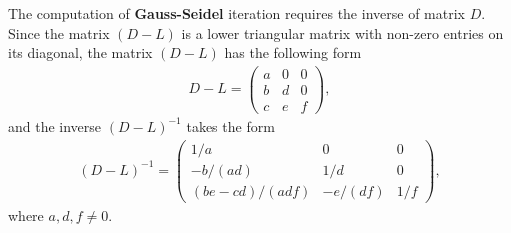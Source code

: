 \documentclass[12pt]{article}
\begin{document}
\begin{remark}
	The computation of \textbf{Gauss-Seidel} iteration requires the inverse of matrix $D$.
	Since the matrix $(D-L)$ is a lower triangular matrix with non-zero entries on its diagonal, 
	the matrix $(D-L)$ has the following form
	\begin{align}
		D-L = 
		\begin{pmatrix}
			a & 0 & 0  \\
			b & d & 0  \\
			c & e & f 
		\end{pmatrix},
	\end{align}
	and the inverse $(D-L)^{-1}$ takes the form
	\begin{align}
		(D-L)^{-1} = 
		\begin{pmatrix}
			1/a           & 0       & 0    \\
			-b/(ad)       & 1/d     & 0    \\
			(be-cd)/(adf) & -e/(df) & 1/f 
		\end{pmatrix},
	\end{align}
	where $a,d,f \neq 0.$
\end{remark}
\end{document}
